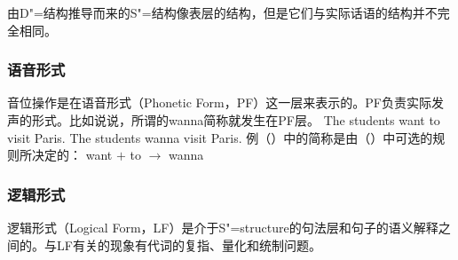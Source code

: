 由D"=结构推导而来的S"=结构像表层的结构，但是它们与实际话语的结构并不完全相同。

\subsubsection{语音形式}

音位操作是在语音形式（Phonetic Form，PF）这一层来表示的。PF负责实际发声的形式。比如说说，所谓的wanna简称就发生在PF层\citep[--21]{Chomsky81a}。
\eal
\ex The students want to visit Paris.
\ex The students wanna visit Paris.
\zl
例（）中的简称是由（）中可选的规则所决定的：
\ea
want $+$ to $\to$ wanna
\z
{}

\subsubsection{逻辑形式}

逻辑形式（Logical Form，LF）是介于S"=structure的句法层和句子的语义解释之间的。与LF有关的现象有代词的复指、量化和统制问题。

